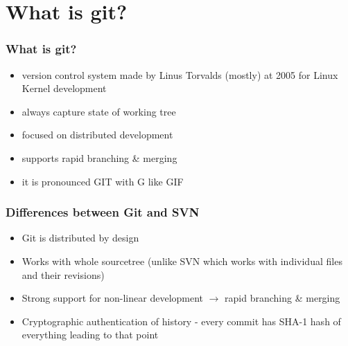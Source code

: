\documentclass{beamer}
\begin{document}
    \section{What is git?}
    \begin{frame}
        \frametitle{What is git?}
        \begin{itemize}
            \item version control system made by Linus Torvalds (mostly) at 2005 for Linux Kernel development
            \item always capture state of working tree
            \item focused on distributed development
            \item supports rapid branching \& merging
            \item it is pronounced GIT with G like GIF ~
        \end{itemize}
    \end{frame}
    \begin{frame}
        \frametitle{Differences between Git and SVN}
        \begin{itemize}
            \item Git is distributed by design
            \item Works with whole sourcetree (unlike SVN which works with individual files and their revisions)
            \item Strong support for non-linear development $\rightarrow$ rapid branching \& merging
            \item Cryptographic authentication of history - every commit has SHA-1 hash of everything leading to that point
        \end{itemize}
    \end{frame}

\end{document}
